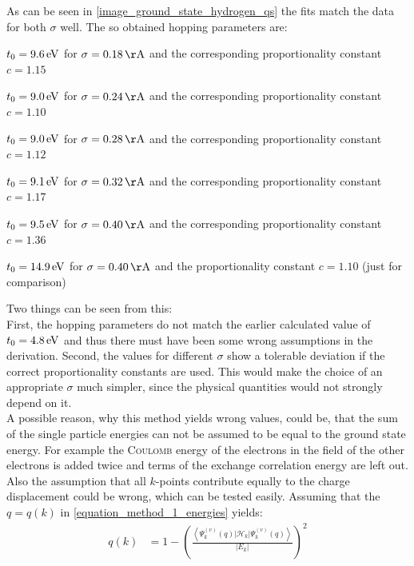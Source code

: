 As can be seen in \cref{image_ground_state_hydrogen_qs} the fits match the data for both $\sigma$ well. \newpage The so obtained hopping parameters are:
\begin{compactitem}
	\item $t_0 = \unit[9.6]{eV}$ for $\sigma = \unit[0.18]{\AA}$ and the corresponding proportionality constant $c = 1.15$
	\item $t_0 = \unit[9.0]{eV}$ for $\sigma = \unit[0.24]{\AA}$ and the corresponding proportionality constant $c = 1.10$
	\item $t_0 = \unit[9.0]{eV}$ for $\sigma = \unit[0.28]{\AA}$ and the corresponding proportionality constant $c = 1.12$
	\item $t_0 = \unit[9.1]{eV}$ for $\sigma = \unit[0.32]{\AA}$ and the corresponding proportionality constant $c = 1.17$
	\item $t_0 = \unit[9.5]{eV}$ for $\sigma = \unit[0.40]{\AA}$ and the corresponding proportionality constant $c = 1.36$
	\item $t_0 = \unit[14.9]{eV}$ for $\sigma = \unit[0.40]{\AA}$ and the proportionality constant $c = 1.10$ (just for comparison)
\end{compactitem}
Two things can be seen from this:\\
First, the hopping parameters do not match the earlier calculated value of $t_0 = \unit[4.8]{eV}$ and thus there must have been some wrong assumptions in the derivation. Second, the values for different $\sigma$ show a tolerable deviation if the correct proportionality constants are used. This would make the choice of an appropriate $\sigma$ much simpler, since the physical quantities would not strongly depend on it.\\
A possible reason, why this method yields wrong values, could be, that the sum of the single particle energies can not be assumed to be equal to the ground state energy. For example the \textsc{Coulomb} energy of the electrons in the field of the other electrons is added twice and terms of the exchange correlation energy are left out. Also the assumption that all $k$-points contribute equally to the charge displacement could be wrong, which can be tested easily. Assuming that the $q = q(k)$ in \cref{equation_method_1_energies} yields:
\begin{align}
	q(k) &= 1 - \left(\frac{\left\langle\Psi_k^{(v)}(q)\Big|\mathcal{H}_{k}\Big|\Psi_k^{(v)}(q)\right\rangle}{\left|E_k\right|}\right)^{2}
\end{align}
